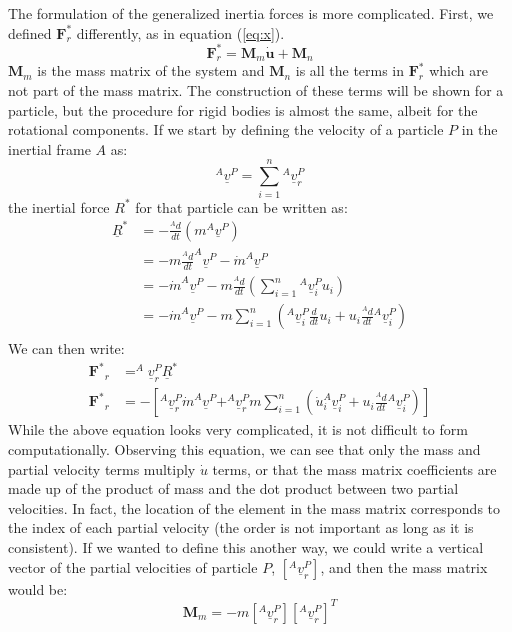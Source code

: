 \documentclass[twocolumn,10pt]{asme2e}
\begin{document}
The formulation of the generalized inertia forces is more complicated.
First, we defined $\mathbf{F}_r^*$ differently, as in equation (\ref{eq:x}).
\begin{equation}
\mathbf{F}_r^* = \mathbf{M}_m \mathbf{\dot{u}} + \mathbf{M}_n
\label{eq:x}
\end{equation}
$\mathbf{M}_m$ is the mass matrix of the system and $\mathbf{M}_n$ is all the
terms in $\mathbf{F}_r^*$ which are not part of the mass matrix. The
construction of these terms will be shown for a particle, but the procedure for
rigid bodies is almost the same, albeit for the rotational components.  If we
start by defining the velocity of a particle $P$ in the inertial frame $A$ as:
\begin{equation}
^{A}\underline{v}^{P} = \sum_{i=1}^{n} {} ^{A}\underline{v}_{r}^{P}
\end{equation}
the inertial force $R^*$ for that particle can be written as:
\begin{align}
\underline{R}^* &= -\frac{^{A} d}{dt}(m ^A\underline{v}^P) \\
&= -m \frac{^{A}d}{dt}^A\underline{v}^P - \dot{m} ^A\underline{v}^P \\
&= -\dot{m} ^A\underline{v}^P - m \frac{^{A}d}{dt}\left(\sum_{i=1}^{n}{} ^A
\underline{v}^P_i u_i \right) \\
&= -\dot{m} ^A\underline{v}^P - m \sum_{i=1}^{n} \left( ^A\underline{v}_i^P
\frac{d}{dt}u_i + u_i \frac{^{A}d}{dt} {}^A\underline{v}^P_i \right) \\
\end{align}
We can then write:
\begin{align}
\mathbf{F^*}_r &= ^A\underline{v}^P_r \underline{R}^{*} \\
\mathbf{F^*}_r &= - \left[
                   ^A\underline{v}^P_r \dot{m} ^A\underline{v}^P +
                   ^A\underline{v}^P_r m \sum_{i=1}^{n} \left(
                   \dot{u}_i ^A\underline{v}^P_i + u_i
                   \frac{^{A}d}{dt} {}^A\underline{v}^P_i
                   \right)
                   \right]
\end{align}
While the above equation looks very complicated, it is not difficult to form
computationally.
Observing this equation, we can see that only the mass and partial velocity
terms multiply $\dot{u}$ terms, or that the mass matrix coefficients are made
up of the product of mass and the dot product between two partial velocities.
In fact, the location of the element in the mass matrix corresponds to the
index of each partial velocity (the order is not important as long as it is
consistent).
If we wanted to define this another way, we could write a vertical vector of
the partial velocities of particle $P$, $[^A\underline{v}^P_r]$, and then the
mass matrix would be:
\begin{equation}
\mathbf{M}_m = -m \left[^A\underline{v}_r^P\right] \left[^A\underline{v}_r^P \right]^T
\end{equation}
\end{document}
